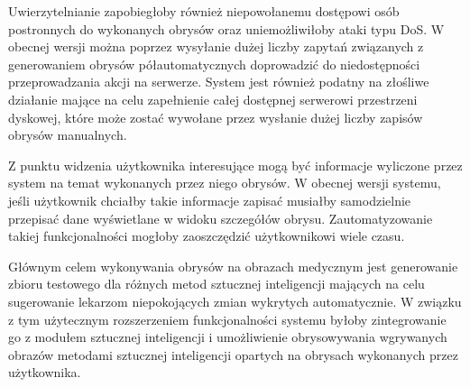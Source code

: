 \documentclass[a4paper,11pt,twoside,openright]{report}
\newcommand\blankpage{%
    \null
    \thispagestyle{empty}%
    \newpage}
\theoremstyle{definition}
\begin{document}
Uwierzytelnianie zapobiegłoby również niepowołanemu dostępowi osób postronnych do wykonanych obrysów oraz uniemożliwiłoby ataki typu DoS. W obecnej wersji można poprzez wysyłanie dużej liczby zapytań związanych z generowaniem obrysów półautomatycznych doprowadzić do niedostępności przeprowadzania akcji na serwerze. System jest również podatny na złośliwe działanie mające na celu zapełnienie całej dostępnej serwerowi przestrzeni dyskowej, które może zostać wywołane przez wysłanie dużej liczby zapisów obrysów manualnych.

Z punktu widzenia użytkownika interesujące mogą być informacje wyliczone przez system na temat wykonanych przez niego obrysów. W obecnej wersji systemu, jeśli użytkownik chciałby takie informacje zapisać musiałby samodzielnie przepisać dane wyświetlane w widoku szczegółów obrysu. Zautomatyzowanie takiej funkcjonalności mogłoby zaoszczędzić użytkownikowi wiele czasu.

Głównym celem wykonywania obrysów na obrazach medycznym jest generowanie zbioru testowego dla różnych metod sztucznej inteligencji mających na celu sugerowanie lekarzom niepokojących zmian wykrytych automatycznie. W związku z tym użytecznym rozszerzeniem funkcjonalności systemu byłoby zintegrowanie go z modułem sztucznej inteligencji i umożliwienie obrysowywania wgrywanych obrazów metodami sztucznej inteligencji opartych na obrysach wykonanych przez użytkownika.




\afterpage{\blankpage}

\end{document}
